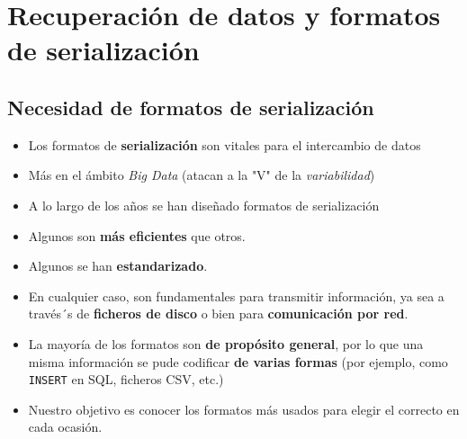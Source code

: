 \section{Recuperación de datos y formatos de serialización}
\subsection{Necesidad de formatos de serialización}
\begin{itemize}
\item Los formatos de \textbf{serialización} son vitales para el intercambio de datos
\item Más en el ámbito \textit{Big Data} (atacan a la "V" de la \textit{variabilidad})
\item A lo largo de los años se han diseñado formatos de serialización
\item Algunos son \textbf{más eficientes} que otros.
\item Algunos se han \textbf{estandarizado}.
\item En cualquier caso, son fundamentales para transmitir información, ya sea a través´s de \textbf{ficheros de disco} o bien para \textbf{comunicación por red}.
\item La mayoría de los formatos son \textbf{de propósito general}, por lo que una misma información se pude codificar \textbf{de varias formas} (por ejemplo, como \texttt{INSERT} en SQL, ficheros CSV, etc.)
\item Nuestro objetivo es conocer los formatos más usados para elegir el correcto en cada ocasión.
\end{itemize}
